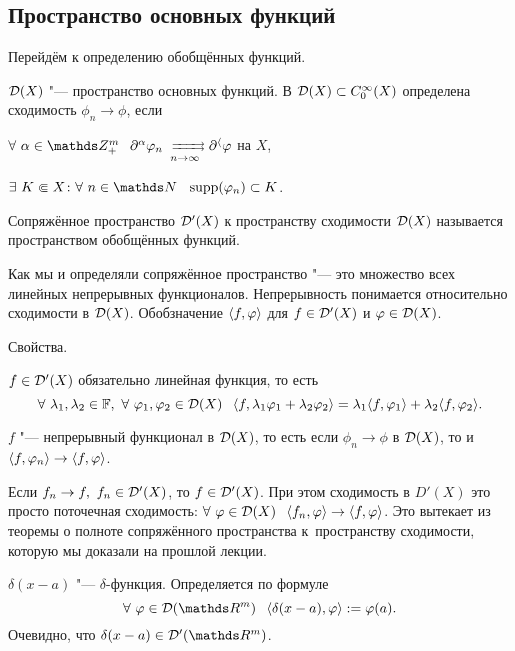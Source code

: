 \subsection{Пространство основных функций}
Перейдём к определению обобщённых функций.
\begin{Def}
  $\mathcal D(X)$ "--- пространство основных функций. В $\mathcal D(X)\subset C_0^\infty(X)$ определена сходимость $\phi_n\to\phi$, если
\begin{roItems}
  \item $\forall\ \alpha\in\Z_+^m\pau \dl^\alpha\phi_n\rsh[ ]{n}\dl^\a\phi$ на $X$,
\item $\exists\ K\Subset X\colon \forall\ n\in\N\pau \supp(\phi_n)\subset K$.
\end{roItems}
\end{Def}

\begin{Def}
  Сопряжённое пространство $\mathcal D'(X)$ к пространству сходимости $\mathcal D(X)$ называется пространством обобщённых функций.
\end{Def}

Как мы и определяли сопряжённое пространство "--- это множество всех линейных непрерывных функционалов. Непрерывность понимается относительно сходимости в $\mathcal D(X)$. Обобзначение $\langle f,\varphi\rangle$ для $f\in \mathcal D'(X)$  и $\varphi\in\mathcal D(X)$.

Свойства.
\begin{roItems}
  \item $f\in\mathcal D'(X)$ обязательно линейная функция, то есть
\[
  \forall\ \l_1,\l_2\in\F,\ \forall\ \phi_1,\phi_2\in\D(X)\pau 
  \la f,\l_1\phi_1+\l_2\phi_2\ra =\l_1\la f,\phi_1\ra +\l_2\la f,\phi_2\ra.
\]
\item $f$ "--- непрерывный функционал в $\mathcal D(X)$, то есть если $\phi_n\to \phi$ в $\mathcal D(X)$, то и $\langle f,\varphi_n\rangle\rightarrow\langle f,\varphi\rangle$.
\item Если $f_n\rightarrow f,\ f_n\in\mathcal D'(X)$, то $f\in\mathcal D'(X)$. При этом сходимость в $D'(X)$ это просто поточечная сходимость: $\forall\ \phi\in\D(X)\pau \la f_n,\phi\ra\to \la f,\phi\ra$.
Это вытекает из теоремы о полноте сопряжённого пространства к~пространству сходимости, которую мы доказали на прошлой лекции.
\end{roItems}

\begin{Exa}
 $\delta(x-a)$ "--- $\delta$-функция. Определяется по формуле
\[
  \forall\ \phi\in\D(\R^m)\pau \la\delta(x-a),\phi\ra:=\phi(a).
\]
Очевидно, что $\delta(x-a)\in\D'(\R^m)$.
\end{Exa}

